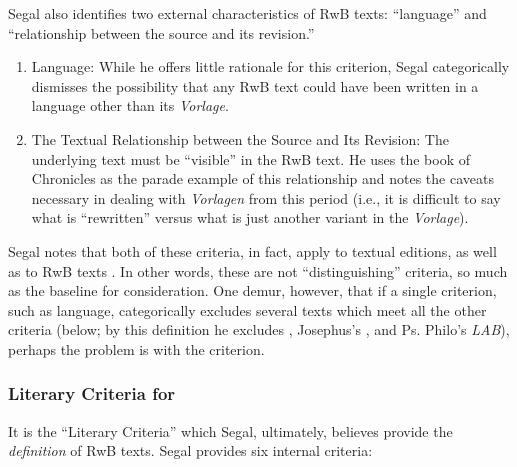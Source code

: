 Segal also identifies two external characteristics of RwB texts: ``language'' and ``relationship between the source and its revision.'' 

 \begin{enumerate}
    \item   Language: While he offers little rationale for this criterion, Segal categorically dismisses the possibility that any RwB text could have been written in a language other than its \emph{Vorlage}.

    \item The Textual Relationship between the Source and Its Revision: The underlying text must be ``visible'' in the RwB text. He uses the book of Chronicles as the parade example of this relationship and notes the caveats necessary in dealing with \emph{Vorlagen} from this period (i.e., it is difficult to say what is ``rewritten'' versus what is just another variant in the \emph{Vorlage}).
\end{enumerate} 

Segal notes that both of these criteria, in fact, apply to textual editions, as well as to RwB texts \autocite[20]{segal_henze2005}. In other words, these are not ``distinguishing'' criteria, so much as the baseline for consideration. One demur, however, that if a single criterion, such as language, categorically excludes several texts which meet all the other criteria (below; by this definition he excludes \ga, Josephus's \ant, and Ps. Philo's \emph{LAB}), perhaps the problem is with the criterion.

\subsubsection{Literary Criteria for \RWB}

It is the ``Literary Criteria'' which Segal, ultimately, believes provide the \emph{definition} of RwB texts.\autocite[20]{segal_henze2005} Segal provides six internal criteria: 

